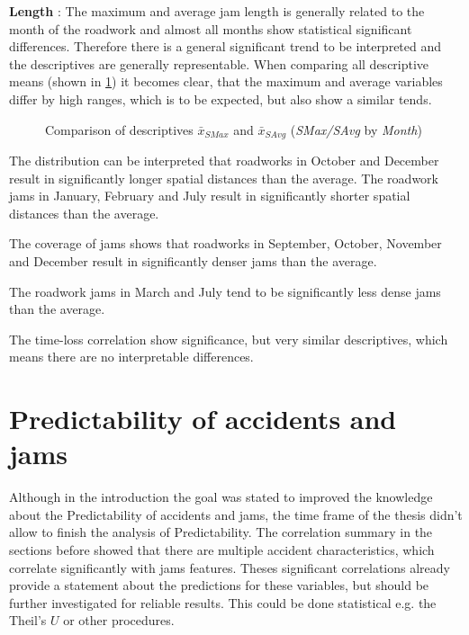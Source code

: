 \textbf{Length} : The maximum and average jam length is generally related to the month of the roadwork and almost all months show statistical significant differences. Therefore there is a general significant trend to be interpreted and the descriptives are generally representable. When comparing all descriptive means (shown in \cref{fig:arbis_matched_meancomparison_month_spatial}) it becomes clear, that the maximum and average variables differ by high ranges, which is to be expected, but also show a similar tends.
\begin{figure}[ht!]
	\data
	\pgfplotstablesort[sort key=means, sort cmp=float >]{\datasorted}{\data}
	\tiny
	\centering
	\caption{Comparison of descriptives $\bar{x}_{SMax}$ and $\bar{x}_{SAvg}$ (\textit{SMax/SAvg} by \textit{Month})}
	\label{fig:arbis_matched_meancomparison_month_spatial}
\end{figure}
The distribution can be interpreted that roadworks in October and December result in significantly longer spatial distances than the average. The roadwork jams in January, February and July result in significantly shorter spatial distances than the average. 

The coverage of jams shows that roadworks in September, October, November and December result in significantly denser jams than the average. 

The roadwork jams in March and July tend to be significantly less dense jams than the average. 

The time-loss correlation show significance, but very similar descriptives, which means there are no interpretable differences.

\section{Predictability of accidents and jams}
Although in the introduction the goal was stated to improved the knowledge about the Predictability of accidents and jams, the time frame of the thesis didn't allow to finish the analysis of Predictability. The correlation summary in the sections before showed that there are multiple accident characteristics, which correlate significantly with jams features. Theses significant correlations already provide a statement about the predictions for these variables, but should be further investigated for reliable results. This could be done statistical e.g. the Theil's $U$ or other procedures.

